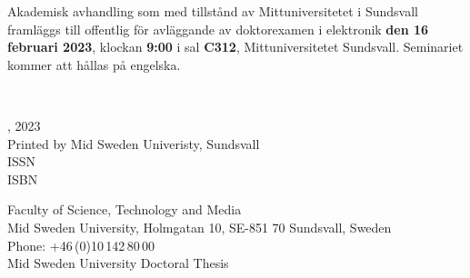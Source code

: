 \thispagestyle{empty}

{\raggedright
Akademisk avhandling som med tillstånd av Mittuniversitetet i Sundsvall framläggs till offentlig för avläggande av doktorexamen i elektronik \textbf{ den 16 februari 2023}, klockan \textbf{9:00} i sal \textbf{C312}, Mittuniversitetet Sundsvall. Seminariet kommer att hållas på engelska.

\vfill

\textbf{{\large\thetitle}}\\

\vspace{2cm}

\textcopyright \theauthor, 2023\\
Printed by Mid Sweden Univeristy, Sundsvall\\
{ISSN \theISSN}\\
{ISBN \theISBN}
\vspace{1cm}

Faculty of Science, Technology and Media\\
Mid Sweden University, Holmgatan 10, SE-851 70 Sundsvall, Sweden\\
Phone: +46\,(0)10\,142\,80\,00\\
Mid Sweden University Doctoral Thesis \theThesisNumber
}